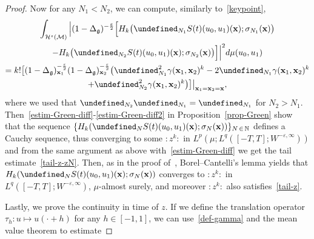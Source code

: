 \documentclass[10pt]{amsart}
\theoremstyle{definition}\newtheorem{defi}[theo]{Definition}\newtheorem{rema}[theo]{Remark}\newtheorem{exam}[theo]{Example}\newtheorem{exem}[theo]{Example}\newtheorem{nota}[theo]{Notation}
\renewcommand{\th}{\tau_h}
\newcommand{\N}{\mathbb{N}}
\let\P= \undefined
\newcommand{\P}{\mathbf{P}}
\newcommand{\x}{\mathbf{x}}
\newcommand{\M}{\mathcal{M}}
\renewcommand{\H}{\mathcal{H}}
\newcommand{\g}{\mathfrak{g}}
\newcommand{\Dlg}{\Delta_{\g}}
\newcommand{\eps}{\varepsilon}
\newcommand{\s}{\sigma}
\begin{document}
\begin{proof}
Now for any $N_1< N_2$, we can compute, similarly to~\eqref{keypoint},
\begin{multline*}
\int_{\H^s(\M)}\Big|(1-\Dlg)^{-\frac\eps2}\Big[H_k\big(\P_{N_1}S(t)(u_0,u_1)(\x);\s_{N_1}(\x)\big)\\
-H_k\big(\P_{N_2}S(t)(u_0,u_1)(\x);\s_{N_2}(\x)\big)\Big]\Big|^2d\mu(u_0,u_1)\\
=k!\big[(1-\Dlg)_{\x_1}^{-\frac\eps2}(1-\Dlg)_{\x_2}^{-\frac\eps2}\big(\P_{N_1}^2\gamma(\x_1,\x_2)^k-2\P_{N_1}\gamma(\x_1,\x_2)^k\\
+\P_{N_2}^2\gamma(\x_1,\x_2)^k\big)\big]\big|_{\x_1=\x_2=\x},
\end{multline*}
where we used that $\P_{N_2}\P_{N_1}=\P_{N_1}$ for $N_2> N_1$. Then~\eqref{estim-Green-diff}-\eqref{estim-Green-diff2} in Proposition~\ref{prop-Green} show that the sequence $\{H_k(\P_{N}S(t)(u_0,u_1)(\x);\s_{N}(\x))\}_{N\,\in\,\N}$ defines a Cauchy sequence, thus converging to some $:z^k:$ in $L^p(\mu;L^q([-T,T];W^{-\eps,\infty}))$ and from the same argument as above with~\eqref{estim-Green-diff} we get the tail estimate~\eqref{tail-z-zN}. Then, as in the proof of~\cite[Proposition~3.2]{OPT}, Borel--Cantelli's lemma yields that $H_k(\P_{N}S(t)(u_0,u_1)(\x);\s_{N}(\x))$ converges to $:z^k:$ in $L^q([-T,T];W^{-\eps,\infty})$, $\mu$-almost surely, and moreover $:z^k:$ also satisfies~\eqref{tail-z}.

Lastly, we prove the continuity in time of $z$. If we define the translation operator $\th: u \mapsto u(\cdot+h)$ for any $h \in [-1,1]$, we can use~\eqref{def-gamma} and the mean value theorem to estimate


\end{proof}
\end{document}
